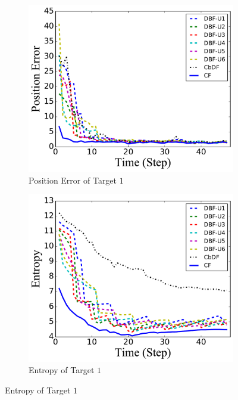 	\begin{figure}%
		\centering
		\begin{subfigure}[b]{0.23\textwidth}
			\includegraphics[width=\textwidth]{figures/hetero_mov_sen_mov_tar_pos_err_noise_linear}
			\caption{Position Error of Target $1$}\label{fig:lin_pos_err}
		\end{subfigure}				
		\begin{subfigure}[b]{0.23\textwidth}
			\includegraphics[width=\textwidth]{figures/hetero_mov_sen_mov_tar_entropy_noise_linear}
			\caption{Entropy of Target $1$}\label{fig:lin_ent}

\end{subfigure}
\end{figure}
